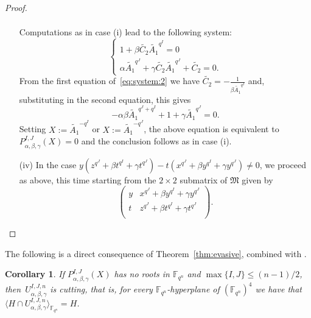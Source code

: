 \documentclass[11pt]{article}
\newtheorem{coro}[theo]{Corollary}
\theoremstyle{definition}
\numberwithin{equation}{section}
\begin{document}
\begin{proof}
\begin{enumerate}
\begin{equation*}
\begin{split}
\end{split}
\end{equation*}
Computations as in case (i) lead to the following system:
\begin{equation}
\label{eq:system:2}
    \begin{cases}
    1 + \beta \tilde{C_2} \tilde{A_1}^{q^I} = 0 \\
    \alpha \tilde{A_1}^{q^J} + \gamma \tilde{C_2} \tilde{A_1}^{q^J} + \tilde{C_2} = 0.
    \end{cases}
\end{equation}
From the first equation of~\eqref{eq:system:2} we  have $\tilde{C_2} = -\frac{1}{\beta \tilde{A_1}^{q^I}}$ and, substituting in the second equation, this gives
\begin{equation*}
     -\alpha\beta \tilde{A_1}^{q^J + q^I} + 1 + \gamma \tilde{A_1}^{q^J} = 0.
\end{equation*}
Setting $X:= \tilde{A_1}^{-q^{I}}$ or $X:= \tilde{A_1}^{-q^{J}}$, the above equation is equivalent to   $P_{\alpha,\beta,\gamma}^{I,J}(X)=0$
and the conclusion follows as in case (i).

\item[(iv)] In the case $y \left(z^{q^J}+\beta t^{q^I} + \gamma t^{q^J}\right) - t\left(x^{q^J}+\beta y^{q^I} + \gamma y^{q^J}\right)\neq 0$, we proceed as above, this time starting from the $2\times 2$ submatrix of $\mathfrak{M}$ given by 
\begin{equation*}
    \begin{pmatrix}
    y &  x^{q^J}+\beta y^{q^I} + \gamma y^{q^J} \\
    t &  z^{q^J}+\beta t^{q^I} + \gamma t^{q^J} \\
    \end{pmatrix}.
\end{equation*}
\end{enumerate}

\end{proof}

The following is a direct consequence of Theorem~\ref{thm:evasive}, combined with \cite[Theorem~3.3]{BMN2022}.
\begin{coro}\label{cor:minimal}
 If  $P^{I,J}_{\alpha,\beta,\gamma}(X)$ has no roots in $\mathbb{F}_{q^n}$ and $\max\{I,J\}\leq (n-1)/2$, then~$U_{\alpha, \beta, \gamma}^{I,J,n}$ is cutting, that is, for every ${\mathbb F}_{q^n}$-hyperplane of $(\mathbb{F}_{q^n})^{4}$ we have that $\langle H\cap U_{\alpha, \beta, \gamma}^{I,J,n} \rangle_{{\mathbb F}_{q^n}} = H$.  
\end{coro}
\end{document}
